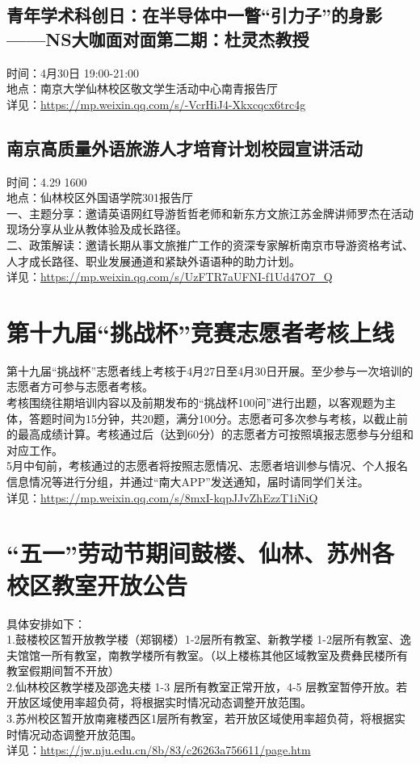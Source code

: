 \documentclass[letterpaper, 12pt]{article}
\begin{document}
\begin{multicols}{2}
\subsection{青年学术科创日：在半导体中一瞥“引力子”的身影——NS大咖面对面第二期：杜灵杰教授} %
时间：4月30日 19:00-21:00
\\地点：南京大学仙林校区敬文学生活动中心南青报告厅
\\详见：\url{https://mp.weixin.qq.com/s/-VcrHiJ4-Xkxcqcx6trc4g}
\subsection{南京高质量外语旅游人才培育计划校园宣讲活动} %
时间：4.29 1600
\\地点：仙林校区外国语学院301报告厅
\\一、主题分享：邀请英语网红导游哲哲老师和新东方文旅江苏金牌讲师罗杰在活动现场分享从业从教体验及成长路径。
\\二、政策解读：邀请长期从事文旅推广工作的资深专家解析南京市导游资格考试、人才成长路径、职业发展通道和紧缺外语语种的助力计划。
\\详见：\url{https://mp.weixin.qq.com/s/UzFTR7aUFNI-f1Ud47O7_Q}

\section{第十九届“挑战杯”竞赛志愿者考核上线} %
第十九届“挑战杯”志愿者线上考核于4月27日至4月30日开展。至少参与一次培训的志愿者方可参与志愿者考核。
\\考核围绕往期培训内容以及前期发布的“挑战杯100问”进行出题，以客观题为主体，答题时间为15分钟，共20题，满分100分。志愿者可多次参与考核，以截止前的最高成绩计算。考核通过后（达到60分）的志愿者方可按照填报志愿参与分组和对应工作。
\\5月中旬前，考核通过的志愿者将按照志愿情况、志愿者培训参与情况、个人报名信息情况等进行分组，并通过“南大APP”发送通知，届时请同学们关注。
\\详见：\url{https://mp.weixin.qq.com/s/8mxI-kqpJJvZhEzzT1iNiQ}



\section{“五一”劳动节期间鼓楼、仙林、苏州各校区教室开放公告} %
具体安排如下：
\\1.鼓楼校区暂开放教学楼（郑钢楼）1-2层所有教室、新教学楼 1-2层所有教室、逸夫馆馆一所有教室，南教学楼所有教室。（以上楼栋其他区域教室及费彝民楼所有教室假期间暂不开放）
\\2.仙林校区教学楼及邵逸夫楼 1-3 层所有教室正常开放，4-5 层教室暂停开放。若开放区域使用率超负荷，将根据实时情况动态调整开放范围。
\\3.苏州校区暂开放南雍楼西区1层所有教室，若开放区域使用率超负荷，将根据实时情况动态调整开放范围。
\\详见：\url{https://jw.nju.edu.cn/8b/83/c26263a756611/page.htm}


\end{multicols}
\end{document}
